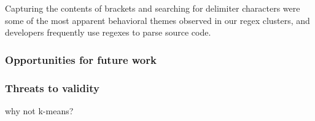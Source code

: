 Capturing the contents of brackets and searching for delimiter characters were some of the most apparent  behavioral themes observed in our regex clusters, and developers frequently use regexes to parse source code.




\subsubsection{Opportunities for future work}
\subsubsection{Threats to validity}
why not k-means?
